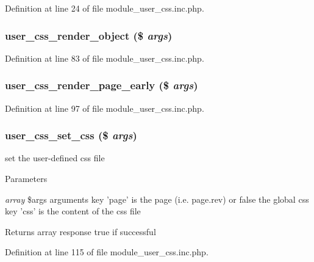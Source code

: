 Definition at line 24 of file module\_\-user\_\-css.inc.php.

\hypertarget{module__user__css_8inc_8php_ab26eaefed01451501b96acf67fbd9401}{
\subsubsection[{user\_\-css\_\-render\_\-object}]{\setlength{\rightskip}{0pt plus 5cm}user\_\-css\_\-render\_\-object (\$ {\em args})}}
\label{module__user__css_8inc_8php_ab26eaefed01451501b96acf67fbd9401}


Definition at line 83 of file module\_\-user\_\-css.inc.php.

\hypertarget{module__user__css_8inc_8php_af0bd5e1927965e4cd775bfb30d510ac1}{
\subsubsection[{user\_\-css\_\-render\_\-page\_\-early}]{\setlength{\rightskip}{0pt plus 5cm}user\_\-css\_\-render\_\-page\_\-early (\$ {\em args})}}
\label{module__user__css_8inc_8php_af0bd5e1927965e4cd775bfb30d510ac1}


Definition at line 97 of file module\_\-user\_\-css.inc.php.

\hypertarget{module__user__css_8inc_8php_a568a25309a9a2419076775fd77dbdfda}{
\subsubsection[{user\_\-css\_\-set\_\-css}]{\setlength{\rightskip}{0pt plus 5cm}user\_\-css\_\-set\_\-css (\$ {\em args})}}
\label{module__user__css_8inc_8php_a568a25309a9a2419076775fd77dbdfda}
set the user-\/defined css file


\begin{DoxyParams}{Parameters}
\item[{\em array}]\$args arguments key 'page' is the page (i.e. page.rev) or false the global css key 'css' is the content of the css file \end{DoxyParams}
\begin{DoxyReturn}{Returns}
array response true if successful 
\end{DoxyReturn}


Definition at line 115 of file module\_\-user\_\-css.inc.php.

